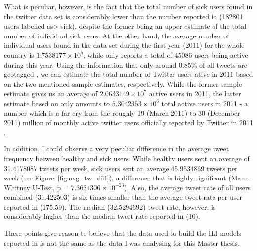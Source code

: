 \documentclass[11pt, a4paper,twoside]{report}\usepackage[]{graphicx}\usepackage[]{color}
\begin{document}
What is peculiar, however, is the fact that the total number of sick users found in the twitter data set is considerably lower than the number reported in \citep{bodnar_data_2015} (182801 users labelled as> sick), despite the former being an upper estimate of the total number of individual sick users. At the other hand, the average number of individual users found in the data set during the first year (2011) for the whole country is \ensuremath{1.7538177\times 10^{5}}, while \citep{bodnar_data_2015} only reports a total of 45086 users being active during this year. Using the information that only around 0.85\% of all tweets are geotagged \citep{sloan_who_2015}, we can estimate the total number of Twitter users ative in 2011 based on the two mentioned sample estimates, respectively. While the former sample estimate gives us an average of \ensuremath{2.0633149\times 10^{7}} active users in 2011, the latter estimate based on \cite{bodnar_data_2015} only amounts to \ensuremath{5.3042353\times 10^{6}} total active users in 2011 - a number which is a far cry from the roughly 19 (March 2011) to 30 (December 2011) million of monthly active twitter users officially reported by Twitter in 2011 \citep{twitter_annual_2013}.\newline

In addition, I could observe a very peculiar difference in the average tweet frequency between healthy and sick users. While healthy users sent an average of 31.4178087 tweets per week, sick users sent an average 45.9534869 tweets per week (see Figure~\ref{fig:avg_tw_diff}), a difference that is highly significant (Mann-Whitney U-Test, p = \ensuremath{7.3631306\times 10^{-23}}). Also, the average tweet rate of all users combined (31.422503) is six times smaller than the average tweet rate per user reported in \citep{bodnar_data_2015} (175.59). The median (32.5294692) tweet rate, however, is considerably higher than the median tweet rate reported in \citep{bodnar_data_2015} (10).\newline

These points give reason to believe that the data used to build the ILI models reported in \citep{bodnar_data_2015} is not the same as the data I was analysing for this Master thesis.\newline
\end{document}
